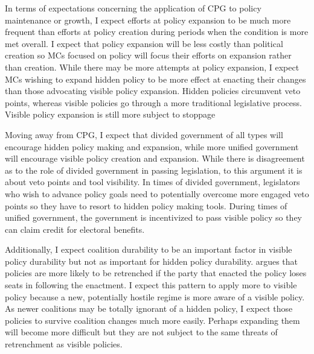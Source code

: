 \documentclass[12pt]{article}
\begin{document}
In terms of expectations concerning the application of CPG to policy maintenance or growth, I expect efforts at policy expansion to be much more frequent than efforts at policy creation during periods when the condition is more met overall. I expect that policy expansion will be less costly than political creation so MCs focused on policy will focus their efforts on expansion rather than creation. While there may be more attempts at policy expansion, I expect MCs wishing to expand hidden policy to be more effect at enacting their changes than those advocating visible policy expansion. Hidden policies circumvent veto points, whereas visible policies go through a more traditional legislative process. Visible policy expansion is still more subject to stoppage 

Moving away from CPG, I expect that divided government of all types will encourage hidden policy making and expansion, while more unified government will encourage visible policy creation and expansion. While there is disagreement as to the role of divided government in passing legislation, to this argument it is about veto points and tool visibility. In times of divided government, legislators who wish to advance policy goals need to potentially overcome more engaged veto points so they have to resort to hidden policy making tools. During times of unified government, the government is incentivized to pass visible policy so they can claim credit for electoral benefits.

Additionally, I expect coalition durability to be an important factor in visible policy durability but not as important for hidden policy durability. \citet{berry2012} argues that policies are more likely to be retrenched if the party that enacted the policy loses seats in following the enactment. I expect this pattern to apply more to visible policy because a new, potentially hostile regime is more aware of a visible policy. As newer coalitions may be totally ignorant of a hidden policy, I expect those policies to survive coalition changes much more easily. Perhaps expanding them will become more difficult but they are not subject to the same threats of retrenchment as visible policies.
\end{document}
